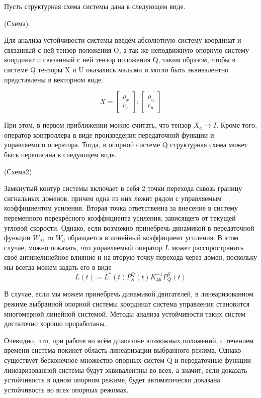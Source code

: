 \documentclass[a4paper]{article}
\begin{document}
Пусть структурная схема системы дана в следующем виде.

(Схема).

Для анализа устойчивости системы введём абсолютную систему координат и связанный с ней тензор положения O, а так же неподвижную опорную систему координат и связанный с ней тензор положения Q, таким образом, чтобы в системе Q тензоры X и U оказались малыми и могли быть эквивалентно представлены в векторном виде.

\begin{equation}X = 
\begin{bmatrix}\rho_x\\r_x\end{bmatrix}; 
\begin{bmatrix}\rho_u\\r_u\end{bmatrix}
\end{equation}

При этом, в первом приближении можно считать, что тензор $X_a \rightarrow I$.
Кроме того, оператор контроллера в виде произведения передаточной функции и управляемого оператора. 
Тогда, в опорной системе Q структурная схема может быть переписана в следующем виде.

(Схема2)

Замкнутый контур системы включает в себя 2 точки перехода сквозь границу сигнальных доменов, причем одна из них лежит рядом с управляемым коэффициентом усиления. Вторая точка ответственна за внесение в систему переменного перекрёсного коэффициента усиления, зависящего от текущей угловой скорости. Однако, если возможно принебречь динамикой в передаточной функции $W_{d}$, то $W_{d}$ обращается в линейный коэффициент усиления. В этом случае, можно показать, что управляемый оператор $L$ может расспространить своё антинелинейное влияние и на вторую точку перехода через домен, поскольку мы всегда можем задать его в виде
\begin{equation} L(t) = L^*(t) P_S^Q(t) K_{дв}^{-1} P_Q^S(t) \end{equation}

В случае, если мы можем принебречь динамикой двигателей, в линеаризованном режиме выбранной опорной системы координат система управления становится многомерной линейной системой. Методы анализа устойчивости таких систем достаточно хорошо проработаны.

Очевидно, что, при работе во всём диапазоне возможных положений, с течением времени система покинет область линеаризации выбранного режима. Однако существует бесконечное множество опорных систем Q и передаточные функции линеаризованной системы будут эквивалентны во всех, а значит, если доказать устойчивость в одном опорном режиме, будет автоматически доказана устойчивость во всех опорных режимах. 
\end{document}
